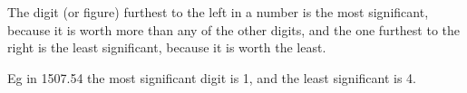 The digit (or figure) furthest to the left in a number is the most significant, because 
it is worth more than any of the other digits, and
the one furthest to the right is the least significant, because it is worth the 
least. 
\par
 Eg in 1507.54 the most significant digit is 1, and the least significant is 4.